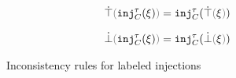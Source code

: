 
\begin{figure}[ht]
\begin{minipage}[t][][b]{.47\linewidth}

  \begin{align*}
    \ctruify{\cinj{C}{\tau}{\xi}} & = \cinj{C}{\tau}{\ctruify{\xi}}
  \end{align*}


  \begin{align*}
    \cfalsify{\cinj{C}{\tau}{\xi}} & = \cinj{C}{\tau}{\cfalsify{\xi}}
  \end{align*}
\end{minipage}
\begin{minipage}[t][][b]{.47\linewidth}
  \judgbox{\cincon{\Xi}}{}

  \begin{mathpar}

  \end{mathpar}
\end{minipage}

  \caption{Inconsistency rules for labeled injections}
  \label{fig:labeled-sums-decidability}
\end{figure}
